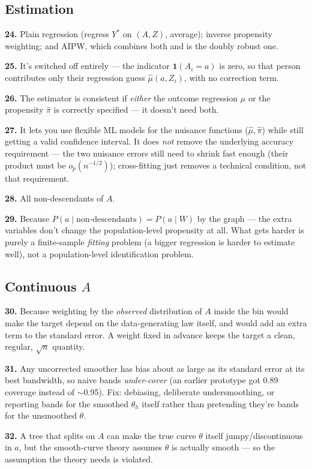 \documentclass[11pt]{article}
\newcommand{\qa}[2]{\par\noindent\textbf{#1.} #2\par\smallskip}
\begin{document}
\subsection*{Estimation}
\qa{24}{Plain regression (regress $Y^*$ on $(A,Z)$, average); inverse
  propensity weighting; and AIPW, which combines both and is the doubly
  robust one.}
\qa{25}{It's switched off entirely --- the indicator $\mathbf 1(A_i{=}a)$
  is zero, so that person contributes only their regression guess
  $\hat\mu(a,Z_i)$, with no correction term.}
\qa{26}{The estimator is consistent if \emph{either} the outcome regression
  $\hat\mu$ or the propensity $\hat\pi$ is correctly specified --- it
  doesn't need both.}
\qa{27}{It lets you use flexible ML models for the nuisance functions
  ($\hat\mu,\hat\pi$) while still getting a valid confidence interval. It
  does \emph{not} remove the underlying accuracy requirement --- the two
  nuisance errors still need to shrink fast enough (their product must be
  $o_p(n^{-1/2})$); cross-fitting just removes a technical condition, not
  that requirement.}
\qa{28}{All non-descendants of $A$.}
\qa{29}{Because $P(a\mid\text{non-descendants}) = P(a\mid W)$ by the graph
  --- the extra variables don't change the population-level propensity at
  all. What gets harder is purely a finite-sample \emph{fitting} problem
  (a bigger regression is harder to estimate well), not a population-level
  identification problem.}

\subsection*{Continuous \texorpdfstring{$A$}{A}}
\qa{30}{Because weighting by the \emph{observed} distribution of $A$ inside
  the bin would make the target depend on the data-generating law itself,
  and would add an extra term to the standard error. A weight fixed in
  advance keeps the target a clean, regular, $\sqrt n$ quantity.}
\qa{31}{Any uncorrected smoother has bias about as large as its standard
  error at its best bandwidth, so naive bands \emph{under-cover} (an
  earlier prototype got 0.89 coverage instead of $\sim$0.95). Fix:
  debiasing, deliberate undersmoothing, or reporting bands for the smoothed
  $\theta_h$ itself rather than pretending they're bands for the
  unsmoothed $\theta$.}
\qa{32}{A tree that splits on $A$ can make the true curve $\theta$ itself
  jumpy/discontinuous in $a$, but the smooth-curve theory assumes $\theta$
  is actually smooth --- so the assumption the theory needs is violated.}
\end{document}
